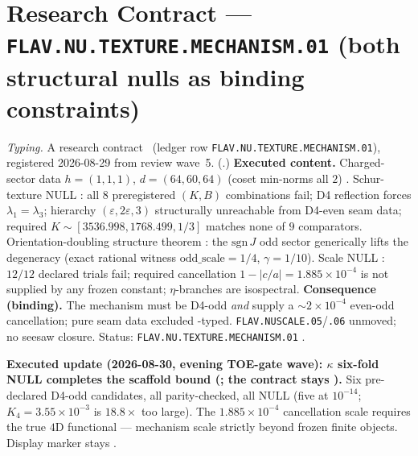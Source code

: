 \section*{Research Contract --- \texttt{FLAV.NU.TEXTURE.MECHANISM.01} (both structural nulls as binding constraints)}
\noindent\emph{Typing.} A research contract \mO\ (ledger row
\texttt{FLAV.NU.TEXTURE.MECHANISM.01}), registered 2026-08-29 from review wave~5.
(.)
\textbf{Executed content.}  Charged-sector data $h=(1,1,1)$, $d=(64,60,64)$ (coset min-norms all
$2$) \mE.  Schur-texture NULL \mX: all $8$ preregistered $(K,B)$ combinations fail; D4 reflection
forces $\lambda_1=\lambda_3$; hierarchy $(\varepsilon,2\varepsilon,3)$ structurally unreachable
from D4-even seam data; required $K\sim[3536.998,1768.499,1/3]$ matches none of $9$ comparators.
Orientation-doubling structure theorem \mE: the $\mathrm{sgn}\,J$ odd sector generically lifts
the degeneracy (exact rational witness $\mathrm{odd\_scale}=1/4$, $\gamma=1/10$).  Scale NULL
\mX: $12/12$ declared trials fail; required cancellation $1-\lvert c/a\rvert=1.885{\times}10^{-4}$
is not supplied by any frozen constant; $\eta$-branches are isospectral.
\textbf{Consequence (binding).}  The mechanism must be D4-odd \emph{and} supply a
$\sim2{\times}10^{-4}$ even-odd cancellation; pure seam data excluded \mX-typed.
\texttt{FLAV.NUSCALE.05}/\texttt{.06} unmoved; no seesaw closure.
Status: \texttt{FLAV.NU.TEXTURE.MECHANISM.01} \mO.

\par\smallskip\noindent\textbf{Executed update (2026-08-30, evening TOE-gate wave): $\kappa$ six-fold
NULL completes the scaffold bound
(; the contract stays \mO).}
Six pre-declared D4-odd candidates, all parity-checked, all NULL (five at $10^{-14}$;
$K_4=3.55{\times}10^{-3}$ is $18.8{\times}$ too large).  The $1.885{\times}10^{-4}$ cancellation
scale requires the true $4$D functional --- mechanism scale strictly beyond frozen finite objects.
Display marker stays \mO.

